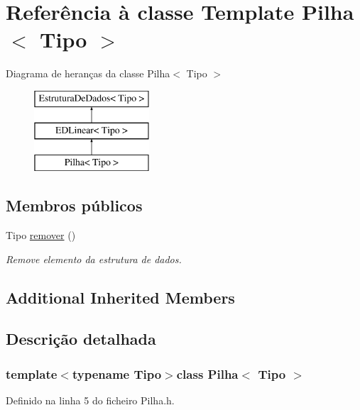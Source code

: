 \hypertarget{classPilha}{\section{Referência à classe Template Pilha$<$ Tipo $>$}
\label{classPilha}
}
Diagrama de heranças da classe Pilha$<$ Tipo $>$\begin{figure}[H]
\begin{center}
\leavevmode
\includegraphics[height=3.000000cm]{classPilha}
\end{center}
\end{figure}
\subsection*{Membros públicos}
\begin{DoxyCompactItemize}
\item 
Tipo \hyperlink{classPilha_a57d9edb93b911f91b4527f7ab365ef8c}{remover} ()
\begin{DoxyCompactList}\small\item\em Remove elemento da estrutura de dados. \end{DoxyCompactList}\end{DoxyCompactItemize}
\subsection*{Additional Inherited Members}


\subsection{Descrição detalhada}
\subsubsection*{template$<$typename Tipo$>$class Pilha$<$ Tipo $>$}



Definido na linha 5 do ficheiro Pilha.\-h.



